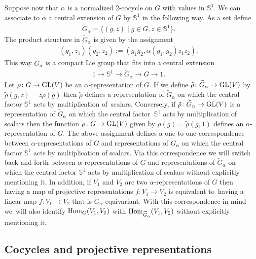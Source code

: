 \documentclass[pdftex]{sigma}
\def\S{\mathbb{S}}
\DeclareMathOperator{\Hom}{\textup{Hom}}
\theoremstyle{definition}
\numberwithin{equation}{section}
\begin{document}
Suppose now that $\alpha$ is a normalized 2-cocycle on $G$ with values in $\S^{1}$.
We can associate to $\alpha$ a central extension of $G$ by $\S^{1}$ in the following way.
As a set define
\begin{gather*}%
\widetilde{G}_{\alpha}=\big\{(g,z)\mid g\in G, z\in \S^{1}\big\}.
\end{gather*}
The product structure in $\widetilde{G}_{\alpha}$ is given by
the assignment
\begin{gather*}
(g_{1},z_{1})(g_{2},z_{2}):=\left(g_{1}g_{2},\alpha(g_{1},g_{2})z_{1}z_{2}\right).
\end{gather*}
This way $\widetilde{G}_{\alpha}$ is a compact Lie group that fits
into a central extension
\begin{gather*}
1\rightarrow \S^{1}\rightarrow
\widetilde{G}_{\alpha}\rightarrow G\rightarrow 1.
\end{gather*}
Let $\rho\colon G\to {\rm GL}(V)$ be an $\alpha$-representation of $G$. If we define
$\tilde{\rho}\colon \widetilde{G}_{\alpha}\to {\rm GL}(V)$
by $\tilde{\rho}(g,z)=z\rho(g)$ then $\tilde{\rho}$ defines a representation of
$\widetilde{G}_{\alpha}$ on which the central factor $\S^{1}$ acts by multiplication of~scalars.
Conversely, if $\tilde{\rho}\colon \widetilde{G}_{\alpha}\to {\rm GL}(V)$ is a representation of
$\widetilde{G}_{\alpha}$ on which the central factor~$\S^{1}$ acts by multiplication of scalars
then the function $\rho\colon G\to {\rm GL}(V)$ given by $\rho(g)=\tilde{\rho}(g,1)$ defines an
$\alpha$-representation of $G$. The above assignment defines a one to one correspondence between
$\alpha$-representations of $G$ and representations of $\widetilde{G}_{\alpha}$ on which the
central factor $\S^{1}$ acts by multiplication of scalars. Via this correspondence we will
switch back and forth between $\alpha$-representations of $G$ and representations of
$\widetilde{G}_{\alpha}$ on which the central factor $\S^{1}$ acts by multiplication of scalars
without explicitly mentioning it. In addition, if $V_{1}$ and $V_{2}$ are two
$\alpha$-repre\-sentations of $G$ then having a map of projective representations
$f\colon V_{1}\to V_{2}$ is equivalent to~having a linear map
$f\colon V_{1}\to V_{2}$ that is $\widetilde{G}_{\alpha}$-equivariant. With this correspondence
in mind we~will also identify $\Hom_{G}(V_{1},V_{2})$ with
$\Hom_{\widetilde{G}_{\alpha}}(V_{1},V_{2})$ without explicitly mentioning it.

\subsection{Cocycles and projective representations}\label{section cocycles}
\end{document}
